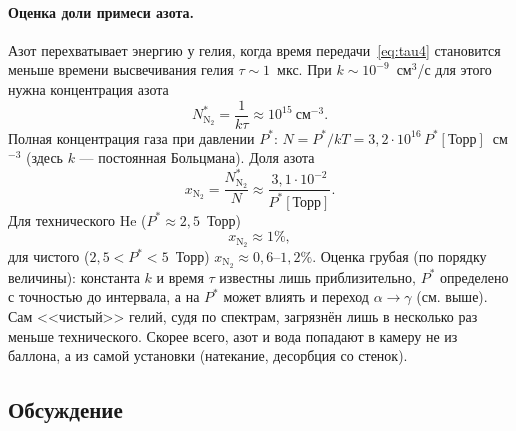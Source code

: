 \documentclass[12pt,a4paper]{article}
\newcommand{\Nt}{\mathrm{N_2}}
\begin{document}
\paragraph{Оценка доли примеси азота.}
Азот перехватывает энергию у гелия, когда время передачи~\eqref{eq:tau4}
становится меньше времени высвечивания гелия $\tau \sim 1$~мкс. При
$k \sim 10^{-9}$~см$^3$/с для этого нужна концентрация азота
\begin{equation}
  N_{\Nt}^* = \frac{1}{k\tau} \approx 10^{15}~\text{см}^{-3}.
\end{equation}
Полная концентрация газа при давлении $P^*$:
$N = P^*/kT = 3{,}2\cdot 10^{16}\,P^*[\text{Торр}]$~см$^{-3}$
(здесь $k$ --- постоянная Больцмана). Доля азота
\begin{equation}
  x_{\Nt} = \frac{N_{\Nt}^*}{N} \approx \frac{3{,}1\cdot 10^{-2}}{P^*[\text{Торр}]}.
  \label{eq:xN2}
\end{equation}
Для технического He ($P^* \approx 2{,}5$~Торр)
\begin{equation}
  x_{\Nt} \approx 1\%,
\end{equation}
для чистого ($2{,}5 < P^* < 5$~Торр) $x_{\Nt}\approx 0{,}6$--$1{,}2\%$.
Оценка грубая (по порядку величины): константа $k$ и время $\tau$
известны лишь приблизительно, $P^*$ определено с точностью до
интервала, а на $P^*$ может влиять и переход $\alpha\to\gamma$ (см.
выше). Сам <<чистый>> гелий, судя по спектрам, загрязнён лишь
в несколько раз меньше технического. Скорее всего, азот и вода
попадают в камеру не из баллона, а из самой установки (натекание,
десорбция со стенок).

\subsection{Обсуждение}
\end{document}
